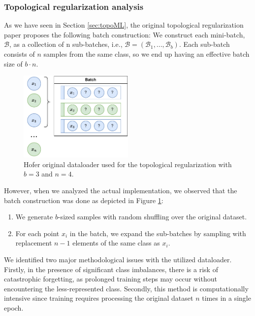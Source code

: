 \documentclass[../main.tex]{subfiles}
\begin{document}
\subsubsection*{Topological regularization analysis}

As we have seen in Section \ref{sec:topoML}, the original topological regularization paper proposes the following batch construction: We construct each mini-batch, $\mathcal{B}$, as a collection of n sub-batches, i.e., $\mathcal{B} = (\mathcal{B}_1, . . . , \mathcal{B}_b)$. Each sub-batch consists of $n$ samples from the same class, so we end up having an effective batch size of $b\cdot n$.

\begin{figure}[!ht]
    \centering
    \includegraphics[width=0.5\textwidth]{figures/mt/hoferData.pdf} 
    \caption{Hofer original dataloader used for the topological regularization with $b=3$ and $n=4$.}
    \label{fig:hoferData}
\end{figure}


However, when we analyzed the actual implementation, we observed that the batch construction was done as depicted in Figure \ref{fig:hoferData}:
\begin{enumerate}
    \item We generate $b$-sized samples with random shuffling over the original dataset.
    \item For each point $x_i$ in the batch, we expand the sub-batches by sampling with replacement $n-1$ elements of the same class as $x_i$. 
\end{enumerate}  


We identified two major methodological issues with the utilized dataloader. Firstly, in the presence of significant class imbalances, there is a risk of catastrophic forgetting, as prolonged training steps may occur without encountering the less-represented class. Secondly, this method is computationally intensive since training requires processing the original dataset $n$ times in a single epoch.\\
\end{document}
